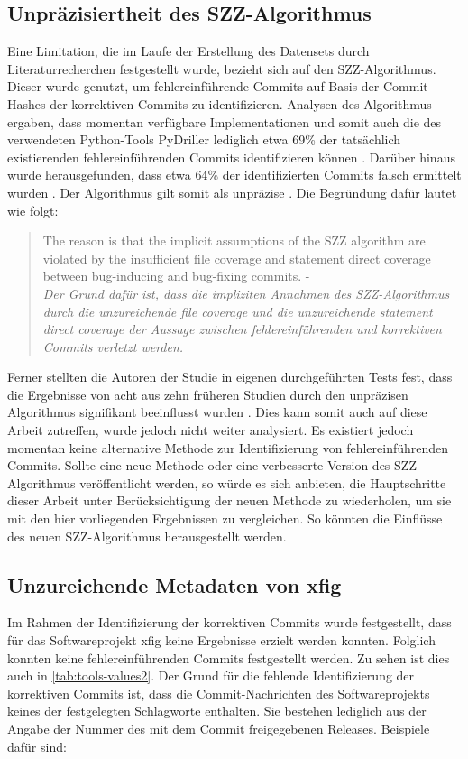 \subsection*{Unpräzisiertheit des SZZ-Algorithmus}

Eine Limitation, die im Laufe der Erstellung des Datensets durch Literaturrecherchen festgestellt wurde, bezieht sich auf den SZZ-Algorithmus. Dieser wurde genutzt, um fehlereinführende Commits auf Basis der Commit-Hashes der korrektiven Commits zu identifizieren. Analysen des Algorithmus ergaben, dass momentan verfügbare Implementationen und somit auch die des verwendeten Python-Tools PyDriller lediglich etwa 69\% der tatsächlich existierenden fehlereinführenden Commits identifizieren können \cite{Wen2019}. Darüber hinaus wurde herausgefunden, dass etwa $64\%$ der identifizierten Commits falsch ermittelt wurden \cite{Wen2019}. Der Algorithmus gilt somit als unpräzise \cite{Wen2019}. Die Begründung dafür lautet wie folgt:

\begin{quotation}
The reason is that the implicit assumptions of the SZZ algorithm
are violated by the insufficient file coverage and statement direct
coverage between bug-inducing and bug-fixing commits. - \cite{Wen2019}
\medskip \\
\textit{Der Grund dafür ist, dass die impliziten Annahmen des SZZ-Algorithmus durch die unzureichende \glqq file coverage\grqq{} und die unzureichende \glqq statement direct
coverage\grqq{} der Aussage zwischen fehlereinführenden und korrektiven Commits verletzt werden.}
\end{quotation}

Ferner stellten die Autoren der Studie in eigenen durchgeführten Tests fest, dass die Ergebnisse von acht aus zehn früheren Studien durch den unpräzisen Algorithmus signifikant beeinflusst wurden \cite{Wen2019}. Dies kann somit auch auf diese Arbeit zutreffen, wurde jedoch nicht weiter analysiert. Es existiert jedoch momentan keine alternative Methode zur Identifizierung von fehlereinführenden Commits. Sollte eine neue Methode oder eine verbesserte Version des SZZ-Algorithmus veröffentlicht werden, so würde es sich anbieten, die Hauptschritte dieser Arbeit unter Berücksichtigung der neuen Methode zu wiederholen, um sie mit den hier vorliegenden Ergebnissen zu vergleichen. So könnten die Einflüsse des neuen SZZ-Algorithmus herausgestellt werden.

\subsection*{Unzureichende Metadaten von xfig}
\label{xfig}
Im Rahmen der Identifizierung der korrektiven Commits wurde festgestellt, dass für das Softwareprojekt \glqq xfig\grqq{} keine Ergebnisse erzielt werden konnten. Folglich konnten keine fehlereinführenden Commits festgestellt werden. Zu sehen ist dies auch in \autoref{tab:tools-values2}. Der Grund für die fehlende Identifizierung der korrektiven Commits ist, dass die Commit-Nachrichten des Softwareprojekts keines der festgelegten Schlagworte enthalten. Sie bestehen lediglich aus der Angabe der Nummer des mit dem Commit freigegebenen Releases. Beispiele dafür sind:


